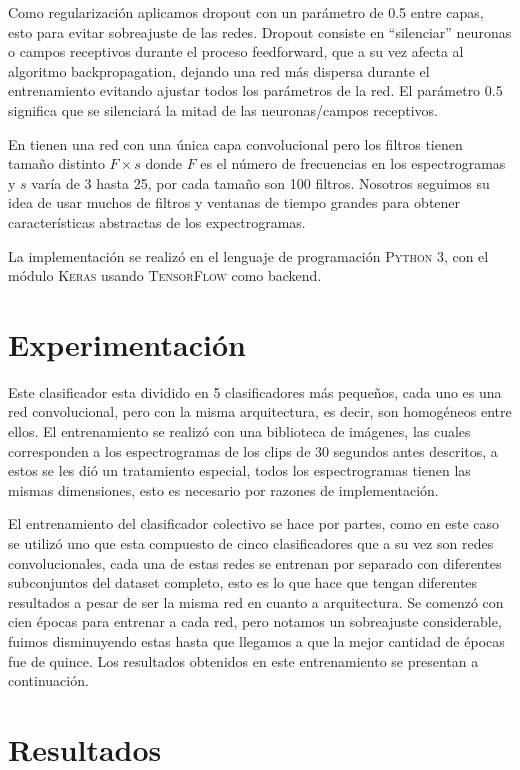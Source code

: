 \documentclass[spanish,11pt,letterpaper]{article}
\begin{document}
Como regularización aplicamos dropout con un parámetro de 0.5 entre capas, esto
para evitar sobreajuste de las redes. Dropout consiste en ``silenciar'' neuronas
o campos receptivos durante el proceso feedforward, que a su vez afecta al
algoritmo backpropagation, dejando una red más dispersa durante el entrenamiento
evitando ajustar todos los parámetros de la red.
El parámetro 0.5 significa que se silenciará la mitad de las neuronas/campos
receptivos.

En \cite{audio_recognition} tienen una red con una única
capa convolucional pero los filtros tienen tamaño distinto $F \times s$ donde
$F$ es el número de frecuencias en los espectrogramas y $s$ varía de 3 hasta 25,
por cada tamaño son 100 filtros. Nosotros seguimos su idea de usar muchos
de filtros y ventanas de tiempo grandes para obtener características abstractas
de los expectrogramas.

La implementación se realizó en el lenguaje de programación \textsc{Python 3},
con el módulo \textsc{Keras} usando \textsc{TensorFlow} como backend.

\section{Experimentación}

Este clasificador esta dividido en 5 clasificadores más pequeños, cada uno es una red convolucional, pero con la
misma arquitectura, es decir, son homogéneos entre ellos. El entrenamiento se realizó con una biblioteca de
imágenes, las cuales corresponden a los espectrogramas de los clips de 30 segundos antes descritos, a estos se les
dió un tratamiento especial, todos los espectrogramas tienen las mismas dimensiones, esto es necesario por razones
de implementación.

El entrenamiento del clasificador colectivo se hace por partes, como en este caso se utilizó uno que esta
compuesto de cinco clasificadores que a su vez son redes convolucionales, cada una de estas redes se entrenan por
separado con diferentes subconjuntos del dataset completo, esto es lo que hace que tengan diferentes resultados a
pesar de ser la misma red en cuanto a arquitectura. Se comenzó con cien épocas para entrenar a cada red, pero
notamos un sobreajuste considerable, fuimos disminuyendo estas hasta que llegamos a que la mejor cantidad de
épocas fue de quince. Los resultados obtenidos en este entrenamiento se presentan a continuación.

\section{Resultados}
\end{document}

